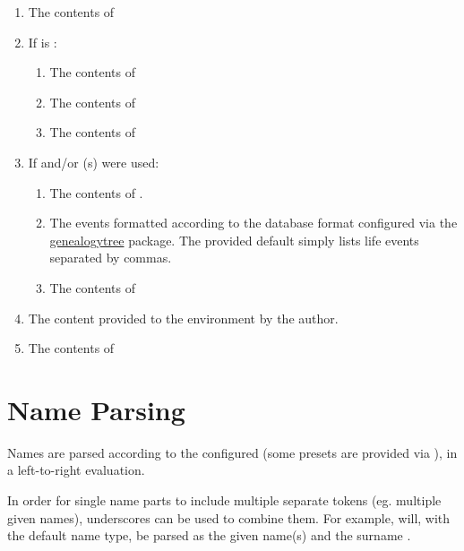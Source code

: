 \documentclass[
	a4paper,
]{article}
\begin{document}
\begin{enumerate}

\item The contents of 

\item If  is :
	\begin{enumerate}
	\item The contents of 
	\item The contents of 
	\item The contents of 
	\end{enumerate}

\item If  and/or (s) were used:
	\begin{enumerate}
	\item The contents of .
	\item The events formatted according to the database format configured via the \href{https://ctan.org/pkg/genealogytree}{genealogytree} package. The provided default simply lists life events separated by commas.
	\item The contents of 
	\end{enumerate}

\item The content provided to the environment by the author.

\item The contents of 

\end{enumerate}


\section{Name Parsing} %

\label{sec:nameparsing}
Names are parsed according to the configured  (some presets are provided via ), in a left-to-right evaluation.

In order for single name parts to include multiple separate tokens (eg. multiple given names), underscores can be used to combine them. For example,  will, with the default  name type, be parsed as the given name(s)  and the surname .
\end{document}
